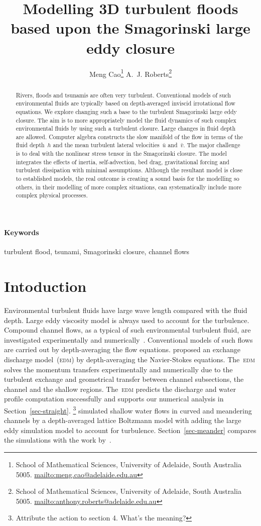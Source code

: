 \documentclass[12pt,a5paper]{article}
\title{Modelling 3D turbulent floods based upon the Smagorinski large eddy closure}
\author{Meng Cao\thanks{School of Mathematical Sciences,
University of Adelaide, South Australia 5005.  \protect\url{mailto:meng.cao@adelaide.edu.au}}
\qquad 
A.~J. Roberts\thanks{School of Mathematical Sciences,
University of Adelaide, South Australia 5005.  \protect\url{mailto:anthony.roberts@adelaide.edu.au}}}
\begin{document}
    
\maketitle

\begin{abstract}
Rivers, floods and tsunamis are often very turbulent. Conventional models of such environmental fluids are typically based on depth-averaged inviscid irrotational flow equations. We explore changing such a base to the turbulent Smagorinski large eddy closure. The aim is to more appropriately model the fluid dynamics of such complex environmental fluids by using such a turbulent closure. Large changes in fluid depth are allowed. Computer algebra constructs the slow manifold of the flow in terms of the fluid depth~$h$ and the mean turbulent lateral velocities~$\bar u$ and~$\bar v$. The major challenge is to deal with the nonlinear stress tensor in the Smagorinski closure. The model integrates the effects of inertia, self-advection, bed drag, gravitational forcing and turbulent dissipation with minimal assumptions. Although the resultant model is close to established models, the real outcome is creating a sound basis for the modelling so others, in their modelling of more complex situations, can systematically include more complex physical processes.
\end{abstract}

\paragraph{Keywords} turbulent flood, tsunami, Smagorinski closure, channel flows

\tableofcontents

\section{Intoduction}

Environmental turbulent fluids have large wave length compared with the fluid depth.
Large eddy viscosity model is always used to account for the turbulence.
Compound channel flows, as a typical of such environmental turbulent fluid, are investigated experimentally and numerically~\cite[e.g.]{Bousmar2002,Liu2009,Demuren1993}.
Conventional models of such flows are carried out by depth-averaging the flow equations. 
\cite{Bousmar2002} proposed an exchange discharge model~(\textsc{edm}) by depth-averaging the Navier-Stokes equations.
The~\textsc{edm} solves the momentum transfers experimentally and numerically due to the turbulent exchange and geometrical transfer between channel subsections, the channel and the shallow regions.
The~\textsc{edm} predicts the discharge and water profile computation successfully and supports our numerical analysis in Section~\ref{sec-straight}. 
\footnote{Attribute the action to section 4. What's the meaning?}
\cite{Liu2009} simulated shallow water flows in curved and meandering channels by a depth-averaged lattice Boltzmann model with adding the large eddy simulation model to account for turbulence.
Section~\ref{sec-meander} compares the simulations with the work by~\cite{Liu2009}. 
\end{document}
